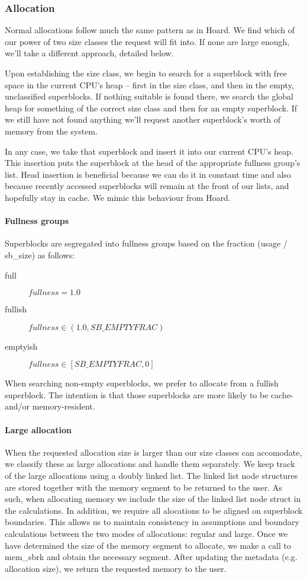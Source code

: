 \documentclass{article}
\begin{document}
\subsubsection{Allocation}
Normal allocations follow much the same pattern as in Hoard. We find which of
our power of two size classes the request will fit into. If none are large 
enough, we'll take a different approach, detailed below.

Upon establishing the size class, we begin to search for a superblock with
free space in the current CPU's heap -- first in the size class, and then in the
empty, unclassified superblocks. If nothing suitable is found there, we search
the global heap for something of the correct size class and then for an empty
superblock. If we still have not found anything we'll request another
superblock's worth of memory from the system.

In any case, we take that superblock and insert it into our current CPU's heap.
This insertion puts the superblock at the head of the appropriate fullness
group's list. Head insertion is beneficial because we can do it in constant
time and also because recently accessed superblocks will remain at the front
of our lists, and hopefully stay in cache. We mimic this behaviour from Hoard.

\paragraph{Fullness groups}
Superblocks are segregated into fullness groups based on the fraction
(usage / sb\_size) as follows:
\begin{description}
    \item[full] $fullness = 1.0$
    \item[fullish] $fullness \in (1.0, SB\_EMPTYFRAC)$
	\item[emptyish] $fullness \in [SB\_EMPTYFRAC, 0]$
\end{description}

When searching non-empty superblocks, we prefer to allocate from a fullish
superblock. The intention is that those superblocks are more likely to be 
cache- and/or memory-resident.

\paragraph{Large allocation}
When the requested allocation size is larger than our size classes can 
accomodate, we classify these as large allocations and handle them separately.
We keep track of the large allocations using a doubly linked list. The linked 
list node structures are stored together with the memory segment to be returned
to the user. As such, when allocating memory we include the size of the linked
list node struct in the calculations. In addition, we require all alocations
to be aligned on superblock boundaries. This allows us to maintain consistency
in assumptions and boundary calculations between the two modes of allocations:
regular and large. Once we have determined the size of the memory segment to
allocate, we make a call to mem\_sbrk and obtain the necessary segment. After
updating the metadata (e.g. allocation size), we return the requested memory 
to the user.
\end{document}
